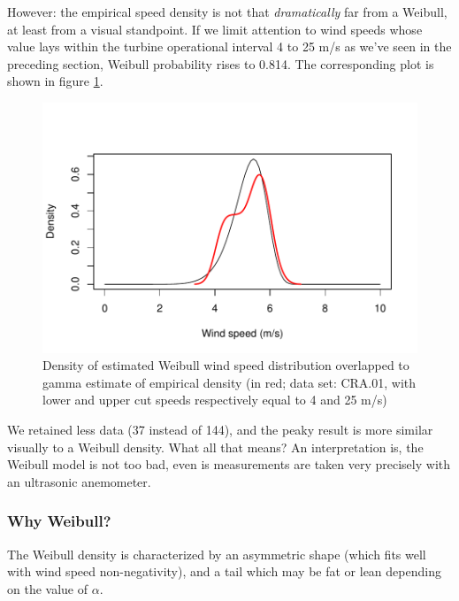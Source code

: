 \documentclass[a4paper,10pt]{book}
\begin{document}
However: the empirical speed density is not that \emph{dramatically} far from a Weibull, at least from a visual standpoint. If we limit attention to wind speeds whose value lays within the turbine operational interval 4 to 25 m/s as we've seen in the preceding section, Weibull probability rises to 0.814. The corresponding plot is shown in figure \ref{fig:CRA01 Weibull and Experimental Cutted}.

\begin{figure}[htp]
 \centering
 \begin{center}
 \includegraphics[scale=0.80,keepaspectratio=true]{./diagrams/CRA01_Weibull_exper_cut.pdf}
 \end{center}
 \caption{Density of estimated Weibull wind speed distribution overlapped to gamma estimate of empirical density (in red; data set: CRA.01, with lower and upper cut speeds respectively equal to 4 and 25 m/s)}
 \label{fig:CRA01 Weibull and Experimental Cutted}
\end{figure}

We retained less data (37 instead of 144), and the peaky result is more similar visually to a Weibull density. What all that means? An interpretation is, the Weibull model is not too bad, even is measurements are taken very precisely with an ultrasonic anemometer.


\subsubsection{Why Weibull?}

The Weibull density is characterized by an asymmetric shape (which fits well with wind speed non-negativity), and a tail which may be fat or lean depending on the value of $ \alpha $.
\end{document}
